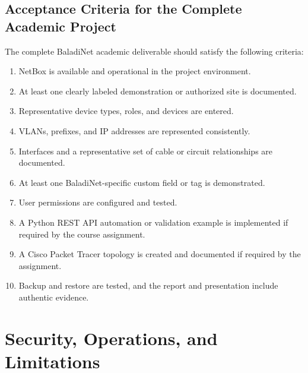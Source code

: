 \documentclass[11pt,a4paper,oneside]{report}
\begin{document}
\section{Acceptance Criteria for the Complete Academic Project}
The complete BaladiNet academic deliverable should satisfy the following criteria:
\begin{enumerate}
  \item NetBox is available and operational in the project environment.
  \item At least one clearly labeled demonstration or authorized site is documented.
  \item Representative device types, roles, and devices are entered.
  \item VLANs, prefixes, and IP addresses are represented consistently.
  \item Interfaces and a representative set of cable or circuit relationships are documented.
  \item At least one BaladiNet-specific custom field or tag is demonstrated.
  \item User permissions are configured and tested.
  \item A Python REST API automation or validation example is implemented if required by the course assignment.
  \item A Cisco Packet Tracer topology is created and documented if required by the assignment.
  \item Backup and restore are tested, and the report and presentation include authentic evidence.
\end{enumerate}

\chapter{Security, Operations, and Limitations}
\end{document}
